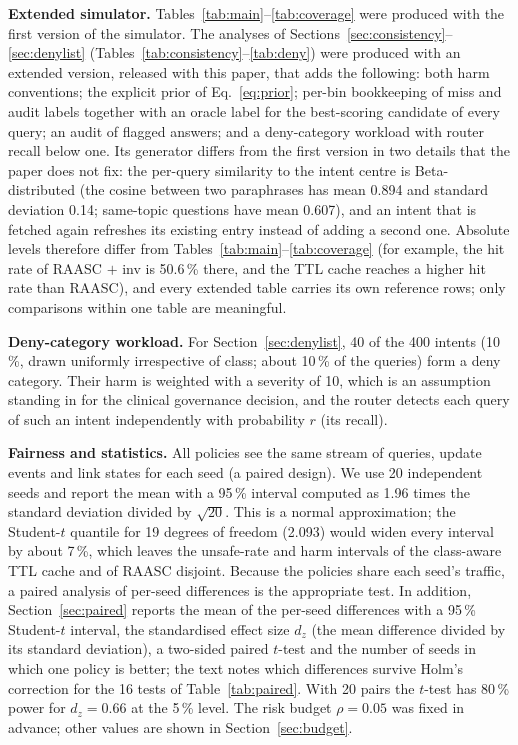 \documentclass[journal]{IEEEtran}
\newcommand{\pct}{\,\%}
\begin{document}
\textbf{Extended simulator.} Tables~\ref{tab:main}--\ref{tab:coverage} were produced with the first version of the simulator. The analyses of Sections~\ref{sec:consistency}--\ref{sec:denylist} (Tables~\ref{tab:consistency}--\ref{tab:deny}) were produced with an extended version, released with this paper, that adds the following: both harm conventions; the explicit prior of Eq.~\eqref{eq:prior}; per-bin bookkeeping of miss and audit labels together with an oracle label for the best-scoring candidate of every query; an audit of flagged answers; and a deny-category workload with router recall below one. Its generator differs from the first version in two details that the paper does not fix: the per-query similarity to the intent centre is Beta-distributed (the cosine between two paraphrases has mean 0.894 and standard deviation 0.14; same-topic questions have mean 0.607), and an intent that is fetched again refreshes its existing entry instead of adding a second one. Absolute levels therefore differ from Tables~\ref{tab:main}--\ref{tab:coverage} (for example, the hit rate of RAASC $+$ inv is 50.6\pct{} there, and the TTL cache reaches a higher hit rate than RAASC), and every extended table carries its own reference rows; only comparisons within one table are meaningful.

\textbf{Deny-category workload.} For Section~\ref{sec:denylist}, 40 of the 400 intents (10\pct{}, drawn uniformly irrespective of class; about 10\pct{} of the queries) form a deny category. Their harm is weighted with a severity of 10, which is an assumption standing in for the clinical governance decision, and the router detects each query of such an intent independently with probability $r$ (its recall).

\textbf{Fairness and statistics.} All policies see the same stream of queries, update events and link states for each seed (a paired design). We use 20 independent seeds and report the mean with a 95\pct{} interval computed as 1.96 times the standard deviation divided by $\sqrt{20}$. This is a normal approximation; the Student-$t$ quantile for 19 degrees of freedom (2.093) would widen every interval by about 7\pct{}, which leaves the unsafe-rate and harm intervals of the class-aware TTL cache and of RAASC disjoint. Because the policies share each seed's traffic, a paired analysis of per-seed differences is the appropriate test. In addition, Section~\ref{sec:paired} reports the mean of the per-seed differences with a 95\pct{} Student-$t$ interval, the standardised effect size $d_z$ (the mean difference divided by its standard deviation), a two-sided paired $t$-test and the number of seeds in which one policy is better; the text notes which differences survive Holm's correction for the 16 tests of Table~\ref{tab:paired}. With 20 pairs the $t$-test has 80\pct{} power for $d_z=0.66$ at the 5\pct{} level. The risk budget $\rho=0.05$ was fixed in advance; other values are shown in Section~\ref{sec:budget}.
\end{document}
